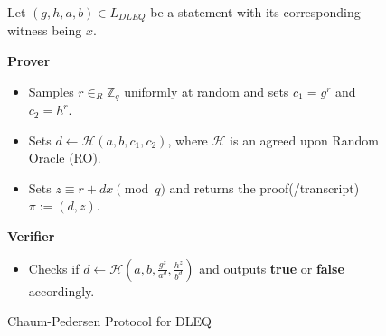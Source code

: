 \begin{figure}[ht]
    \centering
    \begin{tcolorbox}[title=\textbf{Chaum-Pedersen Protocol for DLEQ}, width=0.9\textwidth, colframe=blue!75!black, colback=blue!10, sharp corners]
        Let $(g,h,a,b)\in L_{DLEQ}$ be a statement with its corresponding witness being $x$.
        
        \vspace{0.5em}
        \textbf{Prover}
        \begin{itemize}
            \item Samples $r\in_{R}\mathbb{Z}_q$ uniformly at random and sets 
                $c_1=g^r$ and $c_2=h^r$.
            \item Sets $d\leftarrow \mathcal{H}(a,b,c_1,c_2)$, where $\mathcal{H}$ is 
                an agreed upon Random Oracle (RO).
            \item Sets $z\equiv r+dx \pmod{q}$ and returns the proof(/transcript) $\pi:= (d,z)$.
        \end{itemize}
        
        \vspace{0.5em}
        \textbf{Verifier}
        \begin{itemize}
            \item Checks if $d\leftarrow \mathcal{H}(a,b,\frac{g^z}{a^d},\frac{h^z}{b^d})$ 
                and outputs \textbf{true} or \textbf{false} accordingly.
        \end{itemize}
    \end{tcolorbox}
    \caption{Chaum-Pedersen Protocol for DLEQ}
    \label{fig:chaum-pedersen}
\end{figure}
